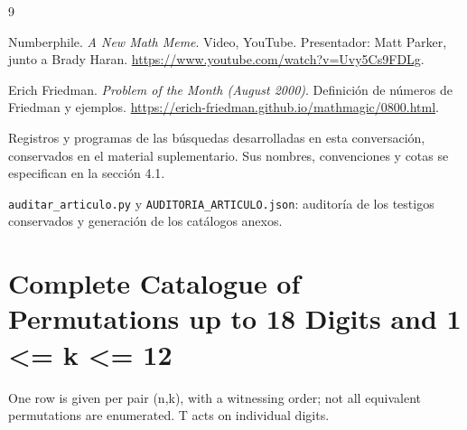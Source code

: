 \documentclass[11pt,a4paper]{article}
\begin{document}
\renewcommand{\refname}{References and Supplementary Material}
\begin{thebibliography}{9}

Numberphile. \emph{A New Math Meme}. Video, YouTube.
Presentador: Matt Parker, junto a Brady Haran.
\url{https://www.youtube.com/watch?v=Uvy5Cs9FDLg}.

Erich Friedman. \emph{Problem of the Month (August 2000)}.
Definición de números de Friedman y ejemplos.
\url{https://erich-friedman.github.io/mathmagic/0800.html}.

Registros y programas de las búsquedas desarrolladas en esta conversación,
conservados en el material suplementario. Sus nombres, convenciones y cotas
se especifican en la sección 4.1.

\nolinkurl{auditar_articulo.py} y \nolinkurl{AUDITORIA_ARTICULO.json}:
auditoría de los testigos conservados y generación de los catálogos anexos.
\end{thebibliography}


\clearpage
\appendix

\section{Complete Catalogue of Permutations up to 18 Digits and 1 <= k <= 12}

One row is given per pair (n,k), with a witnessing order; not all equivalent permutations are enumerated. T acts on individual digits.
\end{document}
